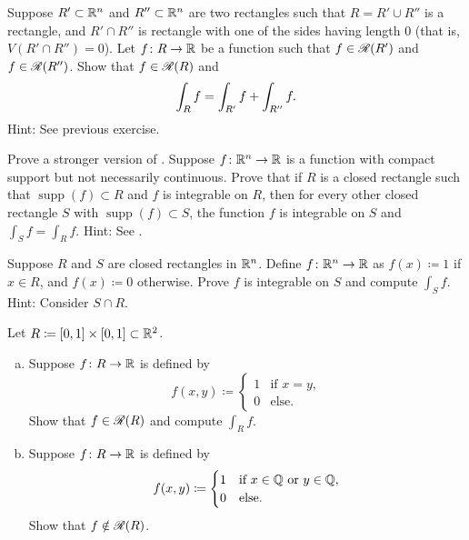 \begin{exercise}
Suppose $R' \subset {\mathbb{R}}^n$ and $R'' \subset {\mathbb{R}}^n$ are two rectangles
such that $R = R' \cup R''$ is a rectangle, and $R' \cap R''$ is rectangle
with one of the sides having length 0 (that is, $V(R' \cap R'') = 0$).
Let $f \colon R \to {\mathbb{R}}$ be a function such that $f \in {\mathscr{R}}(R')$ and
$f \in {\mathscr{R}}(R'')$.  Show that $f \in {\mathscr{R}}(R)$ and
\begin{equation*}
\int_{R} f = \int_{R'} f + \int_{R''} f .
\avoidbreak
\end{equation*}
Hint: See previous exercise.
\end{exercise}

\begin{exercise}
Prove a stronger version of .
Suppose $f \colon {\mathbb{R}}^n \to {\mathbb{R}}$ is a function with compact support but not
necessarily continuous.
Prove that
if $R$ is a closed rectangle such that $\operatorname{supp}(f) \subset R$
and $f$ is integrable on $R$, then for every other closed rectangle
$S$ with $\operatorname{supp}(f) \subset S$,
the function $f$ is integrable on $S$ and
$\int_S f = \int_R f$.
Hint: See .
\end{exercise}

\begin{exercise}
Suppose $R$ and $S$ are closed rectangles in ${\mathbb{R}}^n$.
Define $f \colon {\mathbb{R}}^n \to {\mathbb{R}}$ as $f(x) \coloneqq 1$ if 
$x \in R$, and $f(x) \coloneqq 0$ otherwise.  Prove $f$ is integrable on $S$
and compute $\int_S f$.  Hint: Consider $S \cap R$.
\end{exercise}

\begin{samepage}
\begin{exercise}
Let $R \coloneqq [0,1] \times [0,1] \subset {\mathbb{R}}^2$.
\begin{enumerate}[a)]
\item
Suppose $f \colon R \to {\mathbb{R}}$ is defined by
\begin{equation*}
f(x,y) \coloneqq 
\begin{cases}
1 & \text{if } x = y, \\
0 & \text{else.}
\end{cases}
\end{equation*}
Show that $f \in {\mathscr{R}}(R)$ and compute $\int_R f$.
\item
Suppose $f \colon R \to {\mathbb{R}}$ is defined by
\begin{equation*}
f(x,y) \coloneqq 
\begin{cases}
1 & \text{if } x \in {\mathbb{Q}} \text{ or } y \in {\mathbb{Q}}, \\
0 & \text{else.}
\end{cases}
\end{equation*}
Show that $f \notin {\mathscr{R}}(R)$.
\end{enumerate}
\end{exercise}
\end{samepage}

